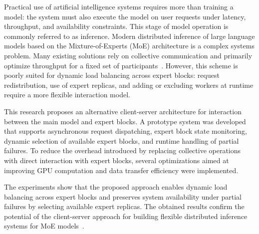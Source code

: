 Practical use of artificial intelligence systems requires more than training a model: the system must also execute the model on user requests under latency, throughput, and availability constraints. This stage of model operation is commonly referred to as inference. Modern distributed inference of large language models based on the Mixture-of-Experts (MoE) architecture is a complex systems problem. Many existing solutions rely on collective communication and primarily optimize throughput for a fixed set of participants~\cite{aminabadi2022deepspeed,deepseekDeepEP}. However, this scheme is poorly suited for dynamic load balancing across expert blocks: request redistribution, use of expert replicas, and adding or excluding workers at runtime require a more flexible interaction model.

This research proposes an alternative client-server architecture for interaction between the main model and expert blocks. A prototype system was developed that supports asynchronous request dispatching, expert block state monitoring, dynamic selection of available expert blocks, and runtime handling of partial failures. To reduce the overhead introduced by replacing collective operations with direct interaction with expert blocks, several optimizations aimed at improving GPU computation and data transfer efficiency were implemented.

The experiments show that the proposed approach enables dynamic load balancing across expert blocks and preserves system availability under partial failures by selecting available expert replicas. The obtained results confirm the potential of the client-server approach for building flexible distributed inference systems for MoE models~\cite{shazeer2017moe,deepseekDeepEP}.
